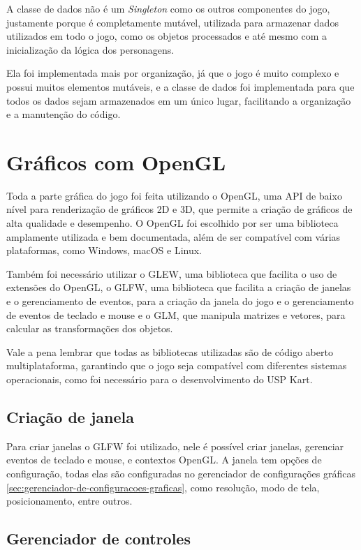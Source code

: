 A classe de dados não é um \textit{Singleton} como os outros componentes do jogo, justamente porque é completamente mutável, utilizada para armazenar dados utilizados em todo o jogo, como os objetos processados e até mesmo com a inicialização da lógica dos personagens.

Ela foi implementada mais por organização, já que o jogo é muito complexo e possui muitos elementos mutáveis, e a classe de dados foi implementada para que todos os dados sejam armazenados em um único lugar, facilitando a organização e a manutenção do código.

\section{Gráficos com OpenGL}

Toda a parte gráfica do jogo foi feita utilizando o OpenGL, uma API de baixo nível para renderização de gráficos 2D e 3D, que permite a criação de gráficos de alta qualidade e desempenho. O OpenGL foi escolhido por ser uma biblioteca amplamente utilizada e bem documentada, além de ser compatível com várias plataformas, como Windows, macOS e Linux.

Também foi necessário utilizar o GLEW, uma biblioteca que facilita o uso de extensões do OpenGL, o GLFW, uma biblioteca que facilita a criação de janelas e o gerenciamento de eventos, para a criação da janela do jogo e o gerenciamento de eventos de teclado e mouse e o GLM, que manipula matrizes e vetores, para calcular as transformações dos objetos.

Vale a pena lembrar que todas as bibliotecas utilizadas são de código aberto multiplataforma, garantindo que o jogo seja compatível com diferentes sistemas operacionais, como foi necessário para o desenvolvimento do USP Kart.

\subsection{Criação de janela}

Para criar janelas o GLFW foi utilizado, nele é possível criar janelas, gerenciar eventos de teclado e mouse, e  contextos OpenGL. A janela tem opções de configuração, todas elas são configuradas no gerenciador de configurações gráficas \ref{sec:gerenciador-de-configuracoes-graficas}, como resolução, modo de tela, posicionamento, entre outros.

\subsection{Gerenciador de controles}\label{sec:gerenciador-de-controles}

